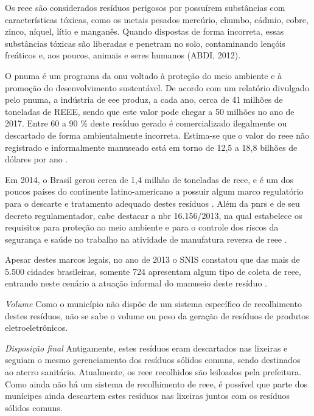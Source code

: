 \begin{description}
	Os \gls{reee} são considerados resíduos perigosos por possuírem substâncias com características tóxicas, como os metais pesados mercúrio, chumbo, cádmio, cobre, zinco, níquel, lítio e manganês. Quando dispostas de forma incorreta, essas substâncias tóxicas são liberadas e penetram no solo, contaminando lençóis freáticos e, aos poucos, animais e seres humanos (ABDI, 2012).
	
	O \gls{pnuma} é um programa da \gls{onu} voltado à proteção do meio ambiente e à promoção do desenvolvimento sustentável. De acordo com um relatório divulgado pelo \gls{pnuma}, a indústria de \gls{eee} produz, a cada ano, cerca de 41 milhões de toneladas de REEE, sendo que este valor pode chegar a 50 milhões no ano de 2017. Entre 60 a 90 \% deste resíduo gerado é comercializado ilegalmente ou descartado de forma ambientalmente incorreta. Estima-se que o valor do \gls{reee} não registrado e informalmente manuseado está em torno de 12,5 a 18,8 bilhões de dólares por ano \cite{onu2017}.
	
	Em 2014, o Brasil gerou cerca de 1,4 milhão de toneladas de \gls{reee}, e é um dos poucos países do continente latino-americano a possuir algum marco regulatório para o descarte e tratamento adequado destes resíduos \cite{WHO2015}. Além da \gls{pnrs} e de seu decreto regulamentador, cabe destacar a \gls{nbr} 16.156/2013, na qual estabelece os requisitos para proteção ao meio ambiente e para o controle dos riscos da segurança e saúde no trabalho na atividade de manufatura reversa de \gls{reee} \cite{ABNT:16156}. 

	Apesar destes marcos legais, no ano de 2013 o SNIS constatou que das mais de 5.500 cidades brasileiras, somente 724 apresentam algum tipo de coleta de \gls{reee}, entrando neste cenário a atuação informal do manuseio deste resíduo \cite{SNIS2014}.
	
		\subitem \textit{Volume}
		Como o município não dispõe de um sistema específico de recolhimento destes resíduos, não se sabe o volume ou peso da geração de resíduos de produtos eletroeletrônicos.
	
		\subitem \textit{Disposição final}
		Antigamente, estes resíduos eram descartados nas lixeiras e seguiam o mesmo gerenciamento dos resíduos sólidos comuns, sendo destinados ao aterro sanitário. Atualmente, os \gls{reee} recolhidos são leiloados pela prefeitura.
		Como ainda não há um sistema de recolhimento de \gls{reee}, é possível que parte dos munícipes ainda descartem estes resíduos nas lixeiras juntos com os resíduos sólidos comuns.
	

\end{description}
